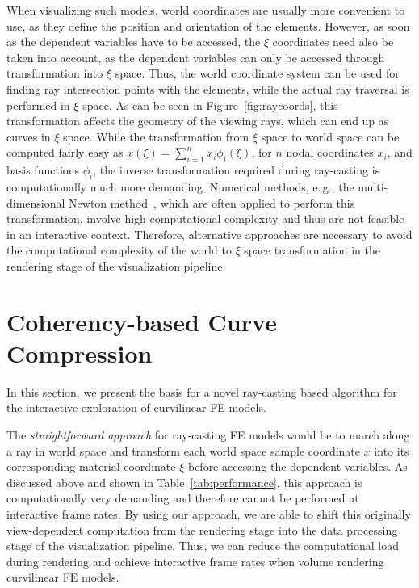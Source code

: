 \documentclass[journal]{vgtc}                %
\begin{document}
When visualizing such models, world coordinates are usually more convenient to use, as they define the position and orientation of the elements. However, as soon as the dependent variables have to be accessed, the $\xi$ coordinates need also be taken into account, as the dependent variables can only be accessed through transformation into $\xi$ space. Thus, the world coordinate system can be used for finding ray intersection points with the elements, while the actual ray traversal is performed in $\xi$ space. As can be seen in Figure~\ref{fig:raycoords}, this transformation affects the geometry of the viewing rays, which can end up as curves in $\xi$ space. While the transformation from $\xi$ space to world space can be computed fairly easy as $x(\xi)=\sum_{i=1}^n x_i \phi_i(\xi)$, for $n$ nodal coordinates $x_i$, and basis functions $\phi_i$, the inverse transformation required during ray-casting is computationally much more demanding. Numerical methods, e.\,g., the multi-dimensional Newton method~\cite{Press92}, which are often applied to perform this transformation, involve high computational complexity and thus are not feasible in an interactive context. Therefore, alternative approaches are necessary to avoid the computational complexity of the world to $\xi$ space transformation in the rendering stage of the visualization pipeline.
%
%
%
\section{Coherency-based Curve Compression}\label{sec:preprocessing}
In this section, we present the basis for a novel ray-casting based algorithm for the interactive exploration of curvilinear FE models.

The \emph{straightforward approach} for ray-casting FE models would be to march along a ray in world space and transform each world space sample coordinate $x$ into its corresponding material coordinate $\xi$ before accessing the dependent variables. As discussed above and shown in Table~\ref{tab:performance}, this approach is computationally very demanding and therefore cannot be performed at interactive frame rates. By using our approach, we are able to shift this originally view-dependent computation from the rendering stage into the data processing stage of the visualization pipeline. Thus, we can reduce the computational load during rendering and achieve interactive frame rates when volume rendering curvilinear FE models.
\end{document}
